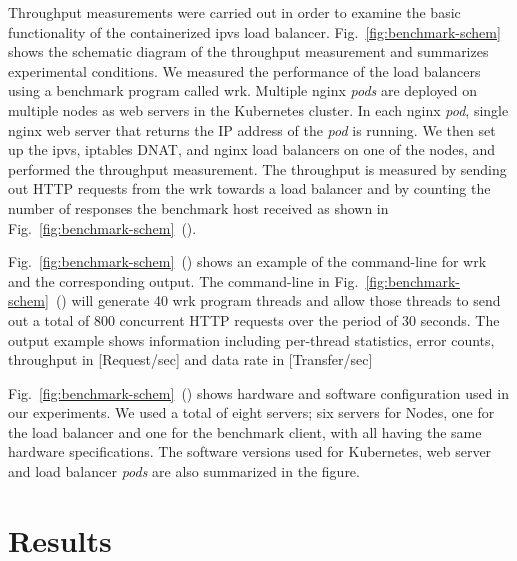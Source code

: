 Throughput measurements were carried out in order to examine the basic functionality of the containerized ipvs load balancer.
Fig.~\ref{fig:benchmark-schem} shows the schematic diagram of the throughput measurement and summarizes experimental conditions.
We measured the performance of the load balancers using a benchmark program called wrk\cite{Glozer2016}.
Multiple nginx {\em pods} are deployed on multiple nodes as web servers in the Kubernetes cluster.
In each nginx {\em pod}, single nginx web server that returns the IP address of the {\em pod} is running.
We then set up the ipvs, iptables DNAT, and nginx load balancers on one of the nodes, and performed the throughput measurement.
The throughput is measured by sending out HTTP requests from the wrk towards a load balancer and by counting the number of responses the benchmark host received as shown in Fig.~\ref{fig:benchmark-schem}~().

Fig.~\ref{fig:benchmark-schem}~() shows an example of the command-line for wrk and the corresponding output.
The command-line in Fig.~\ref{fig:benchmark-schem}~() will generate 40 wrk program threads
and allow those threads to send out a total of 800 concurrent HTTP requests over the period of 30 seconds.
The output example shows information including per-thread statistics, error counts, throughput in [Request/sec] and data rate in [Transfer/sec]

Fig.~\ref{fig:benchmark-schem}~() shows hardware and software configuration used in our experiments.
We used a total of eight servers; six servers for Nodes, one for the load balancer and one for the benchmark client, with all having the same hardware specifications.
The software versions used for Kubernetes, web server and load balancer {\em pods} are also summarized in the figure.


\section{Results}

